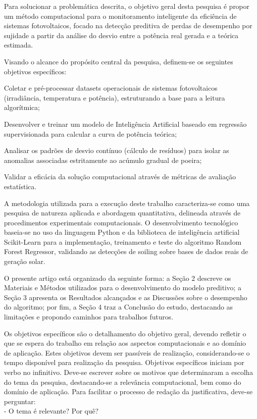\documentclass{UNESC}
\begin{document}
Para solucionar a problemática descrita, o objetivo geral desta pesquisa é propor um método computacional para o monitoramento inteligente da eficiência de sistemas fotovoltaicos, focado na detecção preditiva de perdas de desempenho por sujidade a partir da análise do desvio entre a potência real gerada e a teórica estimada.

Visando o alcance do propósito central da pesquisa, definem-se os seguintes objetivos específicos:

Coletar e pré-processar datasets operacionais de sistemas fotovoltaicos (irradiância, temperatura e potência), estruturando a base para a leitura algorítmica;

Desenvolver e treinar um modelo de Inteligência Artificial baseado em regressão supervisionada para calcular a curva de potência teórica;

Analisar os padrões de desvio contínuo (cálculo de resíduos) para isolar as anomalias associadas estritamente ao acúmulo gradual de poeira;

Validar a eficácia da solução computacional através de métricas de avaliação estatística.

A metodologia utilizada para a execução deste trabalho caracteriza-se como uma pesquisa de natureza aplicada e abordagem quantitativa, delineada através de procedimentos experimentais computacionais. O desenvolvimento tecnológico baseia-se no uso da linguagem Python e da biblioteca de inteligência artificial Scikit-Learn para a implementação, treinamento e teste do algoritmo Random Forest Regressor, validando as detecções de soiling sobre bases de dados reais de geração solar.

O presente artigo está organizado da seguinte forma: a Seção 2 descreve os Materiais e Métodos utilizados para o desenvolvimento do modelo preditivo; a Seção 3 apresenta os Resultados alcançados e as Discussões sobre o desempenho do algoritmo; por fim, a Seção 4 traz a Conclusão do estudo, destacando as limitações e propondo caminhos para trabalhos futuros.



Os objetivos específicos são o detalhamento do objetivo geral, devendo refletir o que se espera do trabalho em relação aos aspectos computacionais e ao domínio de aplicação. Estes objetivos devem ser passíveis de realização, considerando-se o tempo disponível para realização da pesquisa. Objetivos específicos iniciam por verbo no infinitivo.
Deve-se escrever sobre os motivos que determinaram a escolha do tema da pesquisa, destacando-se a relevância computacional, bem como do domínio de aplicação. 
Para facilitar o processo de redação da justificativa, deve-se perguntar: \\
-	O tema é relevante? Por quê? 
\end{document}
